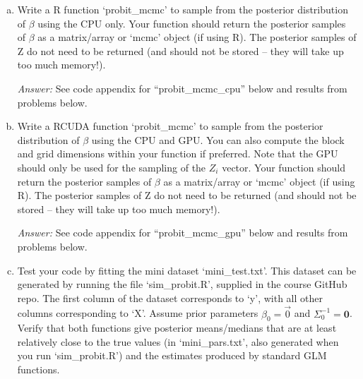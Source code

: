 \documentclass[a4paper, 11pt]{report}
\begin{document}
	
	
	\begin{enumerate}[a)] \setlength\itemindent{0.2em} 
		\item Write a R function `probit\_mcmc' to sample from the posterior distribution of $\beta$ using the CPU only.  Your function should return the posterior samples of $\beta$ as a matrix/array or `mcmc' object (if using R). The posterior samples of Z do not need to be returned (and should not be stored -- they will take up too much memory!). 
		
		\textit{Answer:} See code appendix for ``probit\_mcmc\_cpu'' below and results from problems below.
		
		\item Write a RCUDA function `probit\_mcmc' to sample from the posterior distribution of $\beta$ using the CPU and GPU.  You can also compute the block and grid dimensions within your function if preferred. Note that the GPU should only be used for the sampling of the $Z_i$ vector. Your function should return the posterior samples of $\beta$ as a matrix/array or `mcmc' object (if using R). The posterior samples of Z do not need to be returned (and should not be stored -- they will take up too much memory!).
		
		\textit{Answer:} See code appendix for ``probit\_mcmc\_gpu'' below and results from problems below.
		
		\item Test your code by fitting the mini dataset `mini\_test.txt'. This dataset can be generated by running the file `sim\_probit.R', supplied in the course GitHub repo. The first column of the dataset corresponds to `y', with all other columns corresponding to `X'. Assume prior parameters $\beta_0=\vec{0}$ and $\Sigma_0^{-1}=\mathbf{0}$. Verify that both functions give posterior means/medians that are at least relatively close to the true values (in `mini\_pars.txt', also generated when you run `sim\_probit.R') and the estimates produced by standard GLM functions.
		

\end{enumerate}
\end{document}
